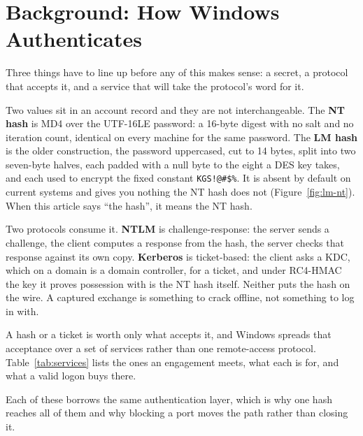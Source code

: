 \section{Background: How Windows Authenticates}
\label{sec:background}

Three things have to line up before any of this makes sense: a secret, a protocol that accepts it,
and a service that will take the protocol's word for it.

Two values sit in an account record and they are not interchangeable. The \textbf{NT hash} is MD4
over the UTF-16LE password: a 16-byte digest with no salt and no iteration count, identical on
every machine for the same password. The \textbf{LM hash} is the older construction, the password
uppercased, cut to 14 bytes, split into two seven-byte halves, each padded with a null
byte to the eight a DES key takes, and each used to encrypt the fixed constant
\texttt{KGS!@\#\$\%}. It is absent by default on current systems and gives you nothing the NT hash
does not (Figure~\ref{fig:lm-nt}). When this article says ``the hash'', it means the NT hash.



Two protocols consume it. \textbf{NTLM} is challenge-response: the server sends a challenge, the
client computes a response from the hash, the server checks that response against its own copy.
\textbf{Kerberos} is ticket-based: the client asks a KDC, which on a domain is a domain
controller, for a ticket, and under RC4-HMAC the key it proves possession with is the NT hash
itself. Neither puts the hash on the wire. A captured exchange is something to crack offline, not
something to log in with.

A hash or a ticket is worth only what accepts it, and Windows spreads that acceptance over a set of
services rather than one remote-access protocol. Table~\ref{tab:services} lists the ones an
engagement meets, what each is for, and what a valid logon buys there.

Each of these borrows the same authentication layer, which is why one hash reaches all of them and
why blocking a port moves the path rather than closing it.

